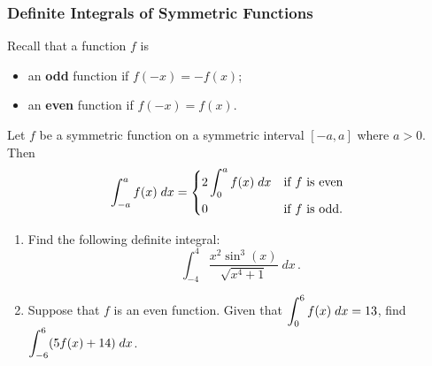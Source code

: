 \documentclass[10pt,t,handout,ignorenonframetext,aspectratio=169]{beamer}
\begin{document}
\begin{frame}
  \frametitle{Definite Integrals of Symmetric Functions}
  Recall that a function $f$ is
  \begin{itemize}
  \item an \textbf{odd} function if $f(-x) = -f(x)$;
  \item an \textbf{even} function if $f(-x) = f(x)$.
  \end{itemize}

  \begin{thm}
    Let $f$ be a symmetric function on a symmetric interval $[-a, a]$
    where $a > 0$. Then
    \begin{equation*}
      \int_{-a}^a f(x) \; dx =
      \begin{dcases*}
        2 \int_0^{a} f(x) \; dx & if $f$ is even \\
        0 & if $f$ is odd.
      \end{dcases*}
    \end{equation*}
  \end{thm}
\end{frame}

\begin{frame}
  \vs
  \begin{question}
    \begin{enumerate}
    \item Find the following definite integral:
      \[
        \int_{-4}^{4} \frac{x^2 \sin^3(x)}{\sqrt{x^4+1}} \; dx \,.
      \]
      \vfill
    \item Suppose that $f$ is an even function. Given that $\displaystyle \int_0^6
      f(x) \; dx = 13$, find $\displaystyle \int_{-6}^{6} (5f(x)+14) \;dx$.
      \vfill
    \end{enumerate}
  \end{question}
\end{frame}
\end{document}
